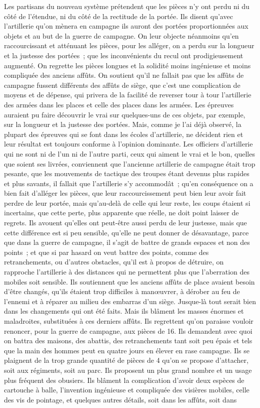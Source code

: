 \documentclass[french,twoside]{book} %
\begin{document}
Les partisans du nouveau système prétendent que les pièces n’y ont perdu ni du côté de l’étendue, ni du côté de la rectitude de la portée. Ils disent qu’avec l’artillerie qu’on mènera en campagne ils auront des portées proportionnées aux objets et au but de la guerre de campagne. On leur objecte néanmoins qu’en raccourcissant et atténuant les pièces, pour les alléger, on a perdu sur la longueur et la justesse des portées ; que les inconvénients du recul ont prodigieusement augmenté. On regrette les pièces longues et la solidité moins ingénieuse et moins compliquée des anciens affûts. On soutient qu’il ne fallait pas que les affûts de campagne fussent différents des affûts de siège, que c’est une complication de moyens et de dépense, qui privera de la facilité de reverser tour à tour l’artillerie des armées dans les places et celle des places dans les armées. Les épreuves auraient pu faire découvrir le vrai sur quelques-uns de ces objets, par exemple, sur la longueur et la justesse des portées. Mais, comme je l’ai déjà observé, la plupart des épreuves qui se font dans les écoles d’artillerie, ne décident rien et leur résultat est toujours conforme à l’opinion dominante. Les officiers d’artillerie qui ne sont ni de l’un ni de l’autre parti, ceux qui aiment le vrai et le bon, quelles que soient ses livrées, conviennent que l’ancienne artillerie de campagne était trop pesante, que les mouvements de tactique des troupes étant devenus plus rapides et plus savants, il fallait que l’artillerie s’y accommodât ; qu’en conséquence on a bien fait d’alléger les pièces, que leur raccourcissement peut bien leur avoir fait perdre de leur portée, mais qu’au-delà de celle qui leur reste, les coups étaient si incertains, que cette perte, plus apparente que réelle, ne doit point laisser de regrets. Ils avouent qu’elles ont peut-être aussi perdu de leur justesse, mais que cette différence est si peu sensible, qu’elle ne peut donner de désavantage, parce que dans la guerre de campagne, il s’agit de battre de grands espaces et non des points ; et que si par hasard on veut battre des points, comme des retranchements, ou d’autres obstacles, qu’il est à propos de détruire, on rapproche l’artillerie à des distances qui ne permettent plus que l’aberration des mobiles soit sensible. Ils soutiennent que les anciens affûts de place avaient besoin d’être changés, qu’ils étaient trop difficiles à manœuvrer, à dérober au feu de l’ennemi et à réparer au milieu des embarras d’un siège. Jusque-là tout serait bien dans les changements qui ont été faits. Mais ils blâment les masses énormes et maladroites, substituées à ces derniers affûts. Ils regrettent qu’on paraisse vouloir renoncer, pour la guerre de campagne, aux pièces de 16. Ils demandent avec quoi on battra des maisons, des abattis, des retranchements tant soit peu épais et tels que la main des hommes peut en quatre jours en élever en rase campagne. Ils se plaignent de la trop grande quantité de pièces de 4 qu’on se propose d’attacher, soit aux régiments, soit au parc. Ils proposent un plus grand nombre et un usage plus fréquent des obusiers. Ils blâment la complication d’avoir deux espèces de cartouche à balle, l’invention ingénieuse et compliquée des visières mobiles, celle des vis de pointage, et quelques autres détails, soit dans les affûts, soit dans 
\end{document}
